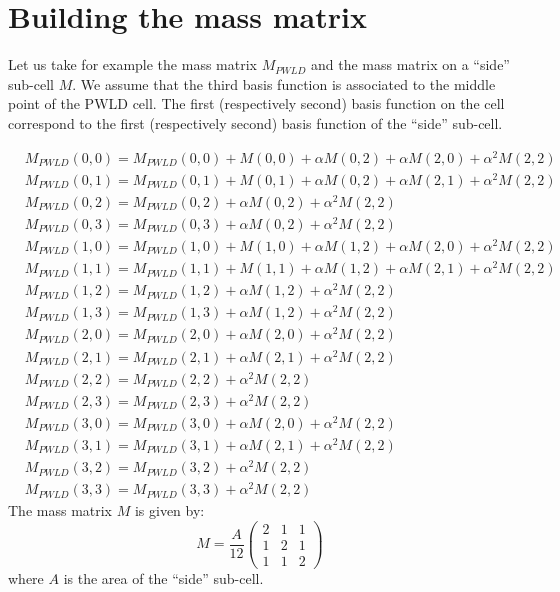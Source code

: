 \appendix
\section{Building the mass matrix}
Let us take for example the mass matrix $M_{PWLD}$ and the mass matrix on a
``side'' sub-cell $M$. We assume that the third basis function is associated
to the middle point of the PWLD cell. The first (respectively second) basis function
on the cell correspond to the first (respectively second) basis function of
the ``side'' sub-cell.

{\allowdisplaybreaks
\begin{align}
& M_{PWLD}(0,0) = M_{PWLD}(0,0) + M(0,0) + \alpha M(0,2) + \alpha M(2,0) + 
\alpha^2M(2,2)\\
& M_{PWLD}(0,1) = M_{PWLD}(0,1) + M(0,1) + \alpha M(0,2) + \alpha M(2,1) + 
\alpha^2M(2,2)\\
& M_{PWLD}(0,2) = M_{PWLD}(0,2) + \alpha M(0,2) + \alpha^2 M(2,2)\\
& M_{PWLD}(0,3) = M_{PWLD}(0,3) + \alpha M(0,2) + \alpha^2M(2,2)\\
& M_{PWLD}(1,0) = M_{PWLD}(1,0) + M(1,0) + \alpha M(1,2) + \alpha M(2,0) + 
\alpha^2M(2,2)\\
& M_{PWLD}(1,1) = M_{PWLD}(1,1) + M(1,1) + \alpha M(1,2) + \alpha M(2,1) + 
\alpha^2M(2,2)\\
& M_{PWLD}(1,2) = M_{PWLD}(1,2) + \alpha M(1,2) + \alpha^2M(2,2)\\
& M_{PWLD}(1,3) = M_{PWLD}(1,3) + \alpha M(1,2) + \alpha^2M(2,2)\\
& M_{PWLD}(2,0) = M_{PWLD}(2,0) + \alpha M(2,0) + \alpha^2M(2,2)\\
& M_{PWLD}(2,1) = M_{PWLD}(2,1) + \alpha M(2,1) + \alpha^2M(2,2)\\
& M_{PWLD}(2,2) = M_{PWLD}(2,2) + \alpha^2M(2,2)\\
& M_{PWLD}(2,3) = M_{PWLD}(2,3) + \alpha^2M(2,2)\\
& M_{PWLD}(3,0) = M_{PWLD}(3,0) + \alpha M(2,0) + \alpha^2M(2,2)\\
& M_{PWLD}(3,1) = M_{PWLD}(3,1) + \alpha M(2,1) + \alpha^2M(2,2)\\
& M_{PWLD}(3,2) = M_{PWLD}(3,2) + \alpha^2M(2,2)\\
& M_{PWLD}(3,3) = M_{PWLD}(3,3) + \alpha^2M(2,2)
\end{align}}    
The mass matrix $M$ is given by:
\begin{equation}
M = \frac{A}{12}
\begin{pmatrix}
2 & 1 & 1\\
1 & 2 & 1\\
1 & 1 & 2
\end{pmatrix}
\end{equation}
where $A$ is the area of the ``side'' sub-cell.
